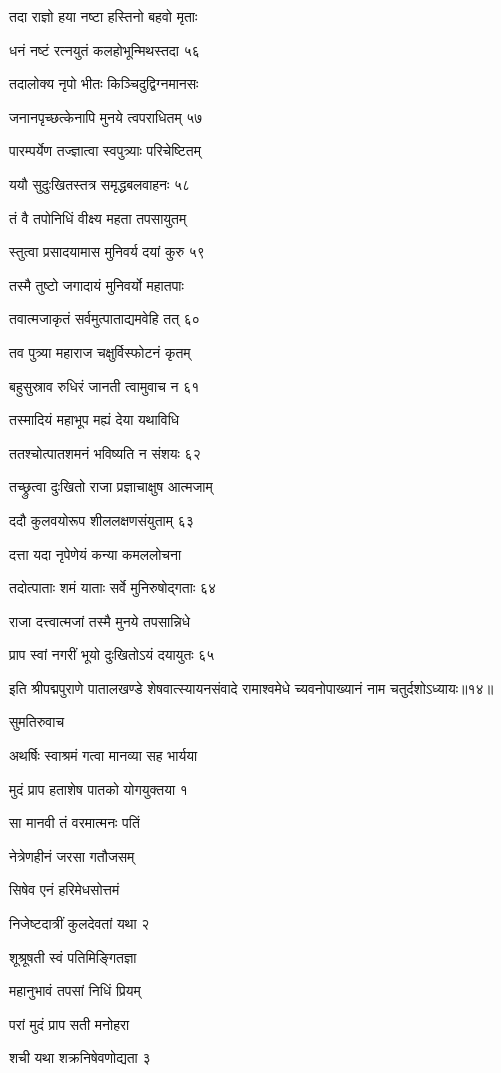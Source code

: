 तदा राज्ञो हया नष्टा हस्तिनो बहवो मृताः

धनं नष्टं रत्नयुतं कलहोभून्मिथस्तदा ५६

तदालोक्य नृपो भीतः किञ्चिदुद्विग्नमानसः

जनानपृच्छत्केनापि मुनये त्वपराधितम् ५७

पारम्पर्येण तज्ज्ञात्वा स्वपुत्र्याः परिचेष्टितम्

ययौ सुदुःखितस्तत्र समृद्धबलवाहनः ५८

तं वै तपोनिधिं वीक्ष्य महता तपसायुतम्

स्तुत्वा प्रसादयामास मुनिवर्य दयां कुरु ५९

तस्मै तुष्टो जगादायं मुनिवर्यो महातपाः

तवात्मजाकृतं सर्वमुत्पाताद्यमवेहि तत् ६०

तव पुत्र्या महाराज चक्षुर्विस्फोटनं कृतम्

बहुसुस्राव रुधिरं जानती त्वामुवाच न ६१

तस्मादियं महाभूप मह्यं देया यथाविधि

ततश्चोत्पातशमनं भविष्यति न संशयः ६२

तच्छ्रुत्वा दुःखितो राजा प्रज्ञाचाक्षुष आत्मजाम्

ददौ कुलवयोरूप शीललक्षणसंयुताम् ६३

दत्ता यदा नृपेणेयं कन्या कमललोचना

तदोत्पाताः शमं याताः सर्वे मुनिरुषोद्गताः ६४

राजा दत्त्वात्मजां तस्मै मुनये तपसान्निधे

प्राप स्वां नगरीं भूयो दुःखितोऽयं दयायुतः ६५

इति श्रीपद्मपुराणे पातालखण्डे शेषवात्स्यायनसंवादे रामाश्वमेधे च्यवनोपाख्यानं नाम चतुर्दशोऽध्यायः॥१४॥


सुमतिरुवाच

अथर्षिः स्वाश्रमं गत्वा मानव्या सह भार्यया

मुदं प्राप हताशेष पातको योगयुक्तया १

सा मानवी तं वरमात्मनः पतिं

नेत्रेणहीनं जरसा गतौजसम्

सिषेव एनं हरिमेधसोत्तमं

निजेष्टदात्रीं कुलदेवतां यथा २

शूश्रूषती स्वं पतिमिङ्गितज्ञा

महानुभावं तपसां निधिं प्रियम्

परां मुदं प्राप सती मनोहरा

शची यथा शक्रनिषेवणोद्यता ३

